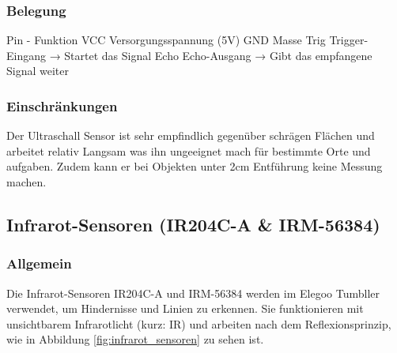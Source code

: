 \subsubsection{Belegung}
Pin  -   	Funktion
VCC	Versorgungsspannung (5V)
GND	Masse
Trig	Trigger-Eingang → Startet das Signal
Echo	Echo-Ausgang → Gibt das empfangene Signal weiter
\subsubsection{Einschränkungen}
Der Ultraschall Sensor ist sehr empfindlich gegenüber schrägen Flächen und arbeitet relativ Langsam was ihn ungeeignet mach für bestimmte Orte und aufgaben. 
Zudem kann er bei Objekten unter 2cm Entführung keine Messung machen.
%
\subsection{Infrarot-Sensoren (IR204C-A \& IRM-56384)}
%
\subsubsection{Allgemein}
Die Infrarot-Sensoren IR204C-A und IRM-56384 werden im Elegoo Tumbller verwendet, um Hindernisse und Linien zu erkennen. Sie funktionieren mit unsichtbarem Infrarotlicht (kurz: IR) und arbeiten nach dem Reflexionsprinzip, wie in Abbildung \ref{fig:infrarot_sensoren} zu sehen ist.
